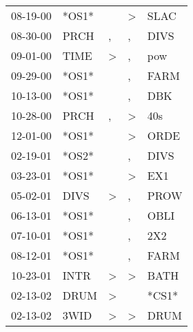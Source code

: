 \begin{supertabular}{p{0.07\textwidth}p{0.06\textwidth}p{0.02\textwidth}p{0.02\textwidth}p{0.06\textwidth}}
 08-19-00\textsuperscript{} &                            *OS1* &               &  \textgreater &           SLAC\textsuperscript{} \\
 08-30-00\textsuperscript{} &           PRCH\textsuperscript{} &             , &             , &           DIVS\textsuperscript{} \\
 09-01-00\textsuperscript{} &           TIME\textsuperscript{} &  \textgreater &             , &            pow\textsuperscript{} \\
 09-29-00\textsuperscript{} &                            *OS1* &               &             , &           FARM\textsuperscript{} \\
 10-13-00\textsuperscript{} &                            *OS1* &               &             , &            DBK\textsuperscript{} \\
 10-28-00\textsuperscript{} &           PRCH\textsuperscript{} &             , &  \textgreater &            40s\textsuperscript{} \\
 12-01-00\textsuperscript{} &                            *OS1* &               &  \textgreater &           ORDE\textsuperscript{} \\
 02-19-01\textsuperscript{} &                            *OS2* &               &             , &           DIVS\textsuperscript{} \\
 03-23-01\textsuperscript{} &                            *OS1* &               &  \textgreater &            EX1\textsuperscript{} \\
 05-02-01\textsuperscript{} &           DIVS\textsuperscript{} &  \textgreater &             , &           PROW\textsuperscript{} \\
 06-13-01\textsuperscript{} &                            *OS1* &               &             , &           OBLI\textsuperscript{} \\
 07-10-01\textsuperscript{} &                            *OS1* &               &             , &            2X2\textsuperscript{} \\
 08-12-01\textsuperscript{} &                            *OS1* &               &             , &           FARM\textsuperscript{} \\
 10-23-01\textsuperscript{} &           INTR\textsuperscript{} &  \textgreater &  \textgreater &           BATH\textsuperscript{} \\
 02-13-02\textsuperscript{} &           DRUM\textsuperscript{} &  \textgreater &               &                            *CS1* \\
 02-13-02\textsuperscript{} &           3WID\textsuperscript{} &  \textgreater &  \textgreater &           DRUM\textsuperscript{} \\

\end{supertabular}

